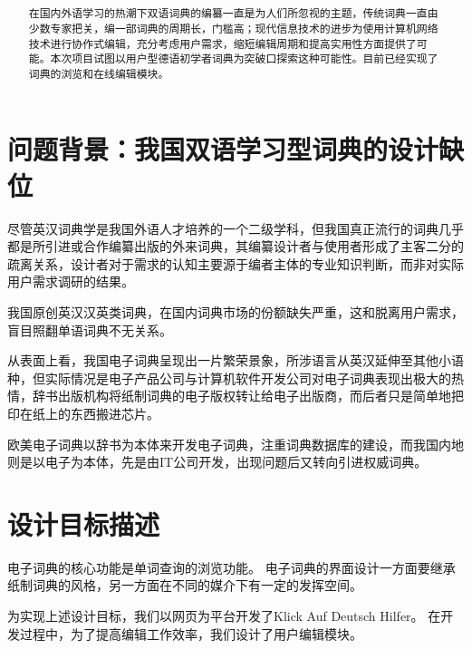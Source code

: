 \documentclass[12pt]{article}
\begin{document}
\title{\textbf{}}
\author{}

\maketitle
\renewcommand{\abstractname}{摘要}
\renewcommand*\contentsname{目录}
\begin{abstract}
在国内外语学习的热潮下双语词典的编纂一直是为人们所忽视的主题，传统词典一直由少数专家把关，编一部词典的周期长，门槛高；现代信息技术的进步为使用计算机网络技术进行协作式编辑，充分考虑用户需求，缩短编辑周期和提高实用性方面提供了可能。本次项目试图以用户型德语初学者词典为突破口探索这种可能性。目前已经实现了词典的浏览和在线编辑模块。
\end{abstract}
\tableofcontents
\large
\twocolumn
\setlength{\columnseprule}{1pt}

\section[问题背景]{问题背景：我国双语学习型词典的设计缺位}
尽管英汉词典学是我国外语人才培养的一个二级学科，但我国真正流行的词典几乎都是所引进或合作编纂出版的外来词典，其编纂设计者与使用者形成了主客二分的疏离关系，设计者对于需求的认知主要源于编者主体的专业知识判断，而非对实际用户需求调研的结果。\cite{Bib1}

我国原创英汉汉英类词典，在国内词典市场的份额缺失严重，这和脱离用户需求，盲目照翻单语词典不无关系。

从表面上看，我国电子词典呈现出一片繁荣景象，所涉语言从英汉延伸至其他小语种，但实际情况是电子产品公司与计算机软件开发公司对电子词典表现出极大的热情，辞书出版机构将纸制词典的电子版权转让给电子出版商，而后者只是简单地把印在纸上的东西搬进芯片。

欧美电子词典以辞书为本体来开发电子词典，注重词典数据库的建设，而我国内地则是以电子为本体，先是由IT公司开发，出现问题后又转向引进权威词典。\cite{Bib2}

\section{设计目标描述}
	电子词典的核心功能是单词查询的浏览功能。
	电子词典的界面设计一方面要继承纸制词典的风格，另一方面在不同的媒介下有一定的发挥空间。
	
	为实现上述设计目标，我们以网页为平台开发了Klick Auf Deutsch Hilfer。
	在开发过程中，为了提高编辑工作效率，我们设计了用户编辑模块。
\end{document}
